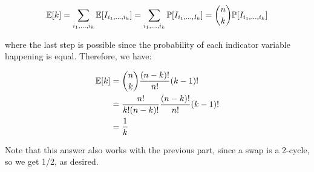\documentclass[11pt]{article}
\begin{document}
\begin{Parts}
\begin{solution}
		\[ \operatorname{\mathbb{E}}[k] = \sum_{i_1, \dots, i_k} \operatorname{\mathbb{E}}[I_{i_1, \dots, i_k}] = \sum_{i_1, \dots, i_k} \mathbb{P}[I_{i_1, \dots, I_k}] = {n \choose k} \mathbb{P}[I_{i_1, \dots, i_k}]\]

		where the last step is possible since the probability of each indicator variable happening is equal. Therefore, we have: 

		\begin{align*}
			\operatorname{\mathbb{E}}[k] &= {n \choose k} \frac{(n-k)!}{n!} (k-1)!\\
			&= \frac{n!}{k!(n-k)!} \frac{(n-k)!}{n!} (k-1)!\\
			&= \frac{1}{k}
		\end{align*}

		Note that this answer also works with the previous part, since a swap is a 2-cycle, so we get 1/2, as desired.
	\end{solution}
	
\end{Parts}
\end{document}
